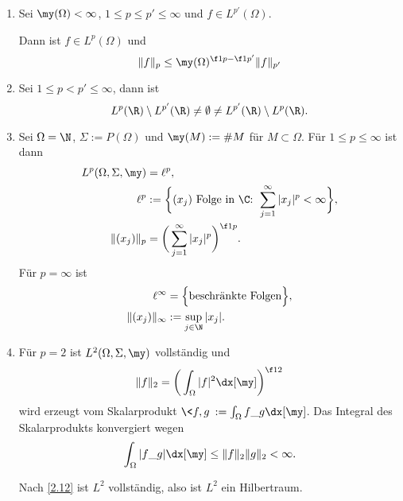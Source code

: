 \begin{st} \label{2.16}
	\begin{enumerate}[1)]
		\item
			Sei $\my(\Omega) < \infty$, $1 \le p \le p' \le \infty$ und $f \in L^{p'}(\Omega)$.

			Dann ist $f \in L^p(\Omega)$ und 
			\[
				\|f\|_p \le \my(\Omega)^{\f 1p - \f 1{p'}} \|f\|_{p'}
			\]
		\item
			Sei $1 \le p < p' \le \infty$, dann ist
			\[
				L^p(\R) \setminus L^{p'}(\R) \neq \emptyset \neq L^{p'}(\R) \setminus L^p(\R).
			\]
		\item
			Sei $\Omega = \N$, $\Sigma := P(\Omega)$ und $\my(M) := \#M$ für $M \subset \Omega$.
			Für $1 \le p \le \infty$ ist dann
			\begin{align*}
				L^p(\Omega, \Sigma, \my) &= \ell^p, \\
				\ell^p &:= \bigg\{ (x_j) \text{ Folge in $\C$: } \sum_{j=1}^\infty |x_j|^p < \infty \bigg\} ,\\
				\|(x_j)\|_p &= \bigg( \sum_{j=1}^\infty |x_j|^p \bigg)^{\f 1p}.
			\end{align*}
			Für $p = \infty$ ist
			\begin{align*}
				\ell^\infty &= \Big\{ \text{beschränkte Folgen} \Big\}, \\
				\|(x_j)\|_\infty &:= \sup_{j\in \N} |x_j|.
			\end{align*}
		\item
			Für $p=2$ ist $L^2(\Omega, \Sigma, \my)$ vollständig und
			\[
				\|f\|_2 = \bigg( \int_{\Omega} |f|^2 \dx[\my] \bigg)^{\f 12}
			\]
			wird erzeugt vom Skalarprodukt $\<f,g\> := \int_{\Omega} f \_g \dx[\my]$.
			Das Integral des Skalarprodukts konvergiert wegen 
			\[
				\int_{\Omega} |f \_g|\dx[\my] \le \|f\|_2 \|g\|_2 < \infty.
			\]

			Nach \ref{2.12} ist $L^2$ vollständig, also ist $L^2$ ein Hilbertraum.
	\end{enumerate}
\end{st}
